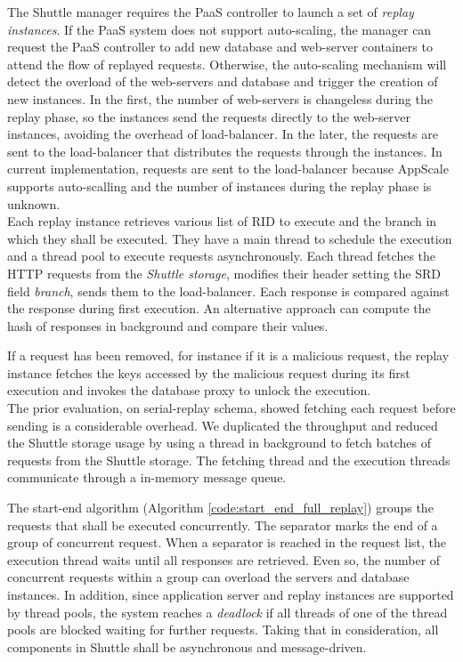 The Shuttle manager requires the \ac{PaaS} controller to launch a set of \textit{replay instances}. If the \ac{PaaS} system does not support auto-scaling, the manager can request the \ac{PaaS} controller to add new database and web-server containers to attend the flow of replayed requests. Otherwise, the auto-scaling mechanism will detect the overload of the web-servers and database and trigger the creation of new instances. In the first, the number of web-servers is changeless during the replay phase, so the instances send the requests directly to the web-server instances, avoiding the overhead of load-balancer. In the later, the requests are sent to the load-balancer that distributes the requests through the instances. In current implementation, requests are sent to the load-balancer because AppScale supports auto-scalling and the number of instances during the replay phase is unknown.\\

Each replay instance retrieves various list of \acf{RID} to execute and the branch in which they shall be executed. They have a main thread to schedule the execution and a thread pool to execute requests asynchronously. Each thread fetches the \ac{HTTP} requests from the \emph{Shuttle storage}, modifies their header setting the \ac{SRD} field \emph{branch}, sends them to the load-balancer. Each response is compared against the response during first execution. An alternative approach can compute the hash of responses in background and compare their values.

If a request has been removed, for instance if it is a malicious request, the replay instance fetches the keys accessed by the malicious request during its first execution and invokes the database proxy to unlock the execution.\\ %

The prior evaluation, on serial-replay schema, showed fetching each request before sending is a considerable overhead. We duplicated the throughput and reduced the Shuttle storage usage by using a thread in background to fetch batches of requests from the Shuttle storage. The fetching thread and the execution threads communicate through a in-memory message queue.

The start-end algorithm (Algorithm \ref{code:start_end_full_replay}) groups the requests that shall be executed concurrently. The separator marks the end of a group of concurrent request. When a separator is reached in the request list, the execution thread waits until all responses are retrieved. Even so, the number of concurrent requests within a group can overload the servers and database instances. In addition, since application server and replay instances are supported by thread pools, the system reaches a \emph{deadlock} if all threads of one of the thread pools are blocked waiting for further requests. Taking that in consideration, all components in Shuttle shall be asynchronous and message-driven.

